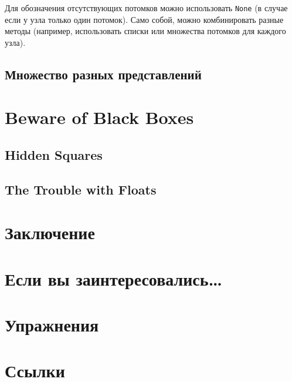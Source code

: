 Для обозначения отсутствующих потомков можно использовать \texttt{None} (в случае если у узла только один потомок). Само собой, можно комбинировать разные методы (например, использовать списки или множества потомков для каждого узла).

\newpage
\subsection{Множество разных представлений}

\section{Beware of Black Boxes}
\subsection{Hidden Squares}
\subsection{The Trouble with Floats}
\section{Заключение}
\section{Если вы заинтересовались…}
\section{Упражнения}
\section{Ссылки}





